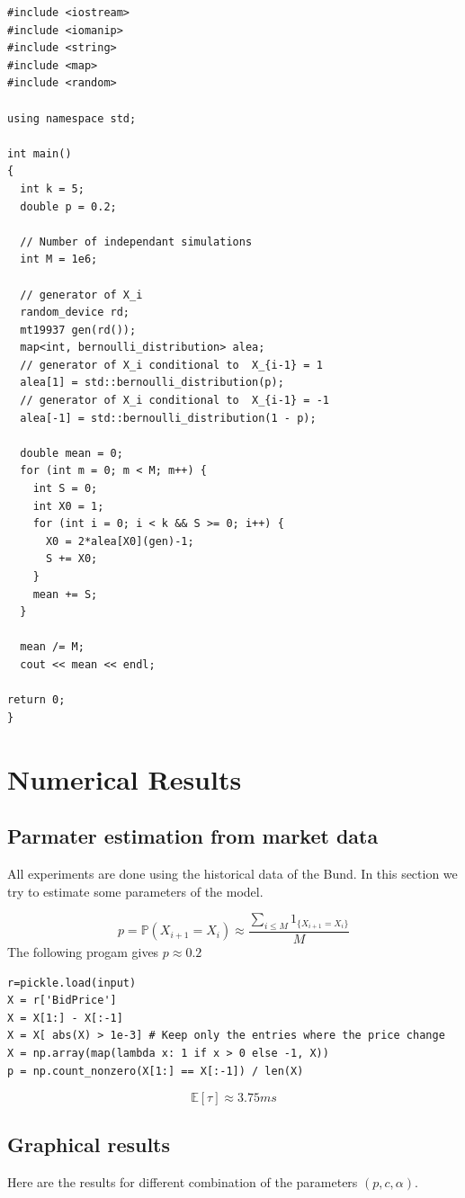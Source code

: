 \documentclass{article}
\begin{document}
\begin{verbatim}
#include <iostream>
#include <iomanip>
#include <string>
#include <map>
#include <random>

using namespace std;

int main()
{
  int k = 5;
  double p = 0.2;

  // Number of independant simulations
  int M = 1e6;

  // generator of X_i
  random_device rd;
  mt19937 gen(rd());
  map<int, bernoulli_distribution> alea;
  // generator of X_i conditional to  X_{i-1} = 1
  alea[1] = std::bernoulli_distribution(p);
  // generator of X_i conditional to  X_{i-1} = -1
  alea[-1] = std::bernoulli_distribution(1 - p);
  
  double mean = 0;
  for (int m = 0; m < M; m++) {
    int S = 0;
    int X0 = 1;
    for (int i = 0; i < k && S >= 0; i++) {
      X0 = 2*alea[X0](gen)-1;
      S += X0;
    }
    mean += S;
  }
  
  mean /= M;
  cout << mean << endl;
  
return 0;
}
\end{verbatim}

\newpage

\section{Numerical Results}
\subsection{Parmater estimation from market data}
All experiments are done using the historical data of the Bund. In this section we try to estimate some parameters of the model.


$$ p = \mathbb{P}(X_{i+1} = X_i)  \approx \frac{ \sum_{i \leq M} 1_{ \{X_{i+1} = X_i \} } }{M} $$
The following progam gives $p \approx 0.2$
\begin{verbatim}
r=pickle.load(input)
X = r['BidPrice']
X = X[1:] - X[:-1]
X = X[ abs(X) > 1e-3] # Keep only the entries where the price change
X = np.array(map(lambda x: 1 if x > 0 else -1, X))
p = np.count_nonzero(X[1:] == X[:-1]) / len(X)
\end{verbatim}

$$\mathbb{E}[ \tau ] \approx 3.75 ms$$


\newpage

\subsection{Graphical results}
Here are the results for different combination of the parameters $(p, c, \alpha)$.
\end{document}

